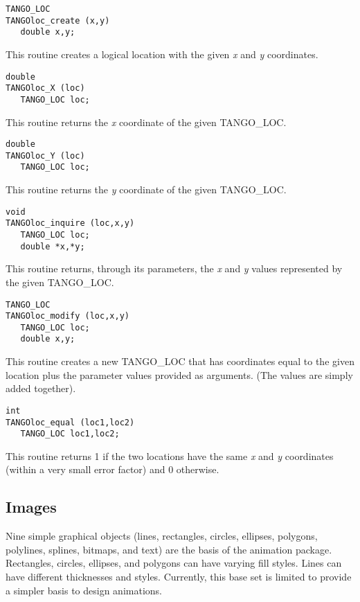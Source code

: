 \vspace{1em}
\begin{verbatim}
TANGO_LOC
TANGOloc_create (x,y) 
   double x,y;
\end{verbatim}
This routine creates a logical location with the given {\em x} and
{\em y}
coordinates.

\vspace{1em}
\begin{verbatim}
double
TANGOloc_X (loc) 
   TANGO_LOC loc;
\end{verbatim}
This routine returns the {\em x} coordinate of the given TANGO\_LOC.

\vspace{1em}
\begin{verbatim}
double
TANGOloc_Y (loc) 
   TANGO_LOC loc;
\end{verbatim}
This routine returns the {\em y} coordinate of the given TANGO\_LOC.

\vspace{1em}
\begin{verbatim}
void
TANGOloc_inquire (loc,x,y) 
   TANGO_LOC loc;
   double *x,*y;
\end{verbatim}
This routine returns, through its parameters, the {\em x} and {\em y}
values represented by the given TANGO\_LOC.

\vspace{1em}
\begin{verbatim}
TANGO_LOC
TANGOloc_modify (loc,x,y) 
   TANGO_LOC loc;
   double x,y;
\end{verbatim}
This routine creates a new TANGO\_LOC that has coordinates equal to the given
location plus the parameter values provided as arguments. (The values are
simply added together).

\vspace{1em}
\begin{verbatim}
int
TANGOloc_equal (loc1,loc2) 
   TANGO_LOC loc1,loc2;
\end{verbatim}
This routine returns 1 if the two locations have the same {\em x}
and {\em y} coordinates (within a very small error factor) and 0 otherwise.

\subsection{Images}
Nine simple graphical objects (lines, rectangles, circles, ellipses,
polygons, polylines, splines, bitmaps,
and text) are the basis of the animation package.  Rectangles, circles,
ellipses, and polygons can have varying fill styles.  Lines can have different
thicknesses and styles.  Currently, this base set is limited to provide a
simpler basis to design animations.

